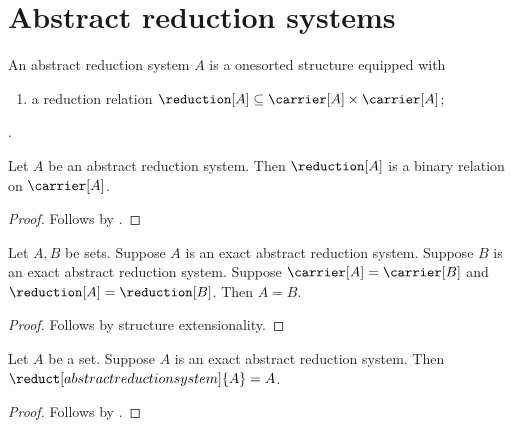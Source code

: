 

\section{Abstract reduction systems}

\begin{struct}\label{abstract_reduction_system}
    An abstract reduction system $A$ is a onesorted structure equipped with
    \begin{enumerate}
        \item\label{abstract_reduction_system_relation}
            a reduction relation
            $\reduction[A]\subseteq
                \carrier[A]\times\carrier[A]$;
    \end{enumerate}.
\end{struct}

\begin{classification}\label{reduction_relation_type}
    Let $A$ be an abstract reduction system.
    Then $\reduction[A]$ is a binary relation on $\carrier[A]$.
\end{classification}
\begin{proof}
    Follows by .
\end{proof}

\begin{theorem}\label{exact_abstract_reduction_system_extensionality}
    Let $A,B$ be sets.
    Suppose $A$ is an exact abstract reduction system.
    Suppose $B$ is an exact abstract reduction system.
    Suppose $\carrier[A]=\carrier[B]$ and
        $\reduction[A]=\reduction[B]$.
    Then $A=B$.
\end{theorem}
\begin{proof}
    Follows by structure extensionality.
\end{proof}

\begin{theorem}\label{exact_abstract_reduction_system_reduct_eq}
    Let $A$ be a set.
    Suppose $A$ is an exact abstract reduction system.
    Then $\reduct[abstract reduction system]{A}=A$.
\end{theorem}
\begin{proof}
    Follows by .
\end{proof}

